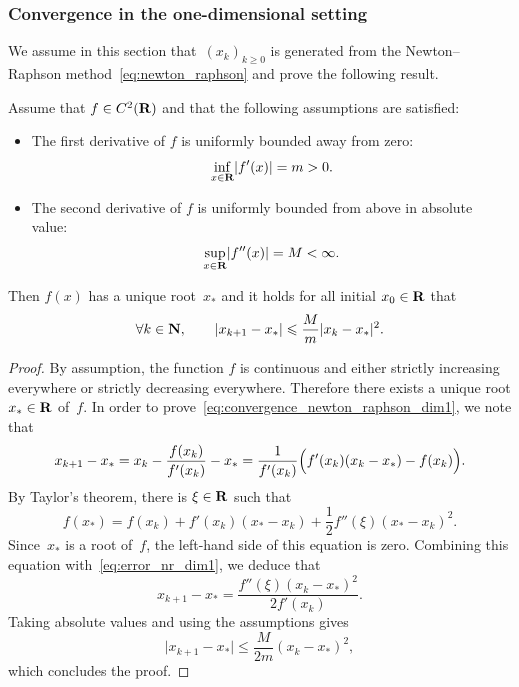 \subsubsection*{Convergence in the one-dimensional setting}
We assume in this section that~$(x_k)_{k\geq 0}$ is generated from the Newton--Raphson method~\eqref{eq:newton_raphson} and prove the following result.
\begin{theorem}
    Assume that $f \in C^2(\mathbf R)$ and that the following assumptions are satisfied:
    \begin{itemize}
        \item
            The first derivative of $f$ is uniformly bounded away from zero:
            \[
                \inf_{x \in \mathbf R} \lvert f'(x)\rvert = m > 0.
            \]

        \item
            The second derivative of $f$ is uniformly bounded from above in absolute value:
            \[
                \sup_{x \in \mathbf R} \lvert f''(x)\rvert = M < \infty.
            \]
    \end{itemize}
    Then $f(x)$ has a unique root~$x_*$ and it holds for all initial $x_0 \in \mathbf R$ that
    \begin{equation}
        \label{eq:convergence_newton_raphson_dim1}
        \forall k \in \mathbf N, \qquad
        \lvert x_{k+1} - x_*\rvert \leqslant \frac{M}{m} \lvert x_{k} - x_*\rvert^2.
    \end{equation}
\end{theorem}
\begin{proof}
    By assumption, the function $f$ is continuous and either strictly increasing everywhere or strictly decreasing everywhere.
    Therefore there exists a unique root $x_* \in \mathbf R$ of~$f$.
    In order to prove~\eqref{eq:convergence_newton_raphson_dim1},
    we note that
    \begin{equation}
        \label{eq:error_nr_dim1}
        x_{k+1} - x_*
        = x_{k} - \frac{f(x_k)}{f'(x_k)}  - x_*
        = \frac{1}{f'(x_k)} \Bigl(f'(x_k)(x_{k} - x_*) - f(x_k)\Bigr).
    \end{equation}
    By Taylor's theorem, there is $\xi \in \mathbf R$ such that
    \[
        f(x_*) = f(x_k) + f'(x_k) (x_* - x_k) + \frac{1}{2} f''(\xi) (x_* - x_k)^2.
    \]
    Since~$x_*$ is a root of~$f$,
    the left-hand side of this equation is zero.
    Combining this equation with~\eqref{eq:error_nr_dim1},
    we deduce that
    \[
        x_{k+1} - x_*  = \frac{f''(\xi) (x_k - x_*)^2}{2f'(x_k)}.
    \]
    Taking absolute values and using the assumptions gives
    \[
        \lvert x_{k+1} - x_* \rvert
        \leq \frac{M}{2m} (x_k - x_*)^2,
    \]
    which concludes the proof.
\end{proof}


